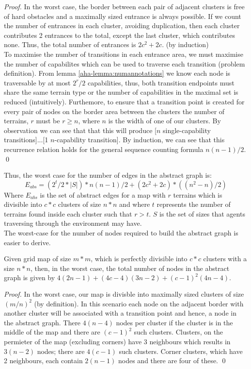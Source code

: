 \begin{proof}
In the worst case, the border between each pair of adjacent clusters is free of hard obstacles and a maximally sized entrance is always possible. If we count the number of entrances in each cluster, avoiding duplication, then each cluster contributes 2 entrances to the total, except the last cluster, which contributes none. Thus, the total number of entrances is $2c^2 + 2c$. (by induction) \\
To maximise the number of transitions in each entrance area, we must maximise the number of capabilites which can be used to traverse each transition (problem definition). From lemma \ref{aha-lemma:numannotations} we know each node is traversable by at most $2^r/2$ capabilities, thus, both transition endpoints must share the same terrain type or the number of capabilities in the maximal set is reduced (intuitively).
Furthemore, to ensure that a transition point is created for every pair of nodes on the border area between the clusters the number of terrains, $r$ must be $r \geq n$, where $n$ is the width of one of our clusters. By observation we can see that that this will produce [$n$ single-capability transitions]...[1 $n$-capability transition]. By induction, we can see that this recurrence relation holds for the general sequence counting formula $n(n-1)/2$. \qed
\end{proof}
Thus, the worst case for the number of edges in the abstract graph is: 
\begin{equation}
\label{aha-eq:maxabstractedges}
E_{abs} = (2^t/2 * |S|) * n(n-1)/2 + (2c^2 + 2c)*((n^2-n)/2)
\end{equation}
Where $E_{abs}$ is the set of abstract edges for a map with $r$ terrains which is divisible into $c*c$ clusters of size $n*n$ and where $t$ represents the number of terrains found inside each cluster such that $r > t$. $S$ is the set of sizes that agents traversing through the environment may have. \\ \newline
The worst-case for the number of nodes required to build the abstract graph is easier to derive. 
\begin{lemma}
\label{aha-lemma:maxnodes}
Given grid map of size $m*m$, which is perfectly divisible into $c*c$ clusters with a size $n*n$, then, in the worst case, the total number of nodes in the abstract graph is given by $4(2n-1) + (4c - 4)(3n-2) + (c-1)^2(4n-4)$.
\end{lemma}

\begin{proof}
In the worst case, our map is divisble into maximally sized clusters of size $(m/n)^2$ (by definition). In this scenario each node on the adjacent border with another cluster will be associated with a transition point and hence, a node in the abstract graph.
There $4(n-4)$ nodes per cluster if the cluster is in the middle of the map and there are $(c-1)^2$ such clusters. Clusters, on the permieter of the map (excluding corners) have 3 neighbours which results in $3(n-2)$ nodes; there are $4(c-1)$ such clusters. Corner clusters, which have 2 neighbours, each contain $2(n-1)$ nodes and there are four of these. \qed
\end{proof}

